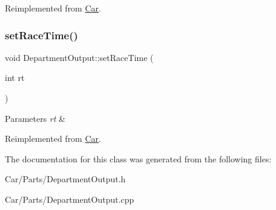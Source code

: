 Reimplemented from \hyperlink{classCar_ad7148bd1abe107ce2e2b134f78582c9d}{Car}.

\mbox{\label{classDepartmentOutput_a99c1b2cf729b25bc2f1d48214019c678}} 
\subsubsection{\texorpdfstring{set\+Race\+Time()}{setRaceTime()}}
{\footnotesize\ttfamily void Department\+Output\+::set\+Race\+Time (\begin{DoxyParamCaption}\item[{int}]{rt }\end{DoxyParamCaption})\hspace{0.3cm}{\ttfamily [virtual]}}


\begin{DoxyParams}{Parameters}
{\em rt} & \\
\hline
\end{DoxyParams}


Reimplemented from \hyperlink{classCar}{Car}.



The documentation for this class was generated from the following files\+:\begin{DoxyCompactItemize}
\item 
Car/\+Parts/Department\+Output.\+h\item 
Car/\+Parts/Department\+Output.\+cpp\end{DoxyCompactItemize}
